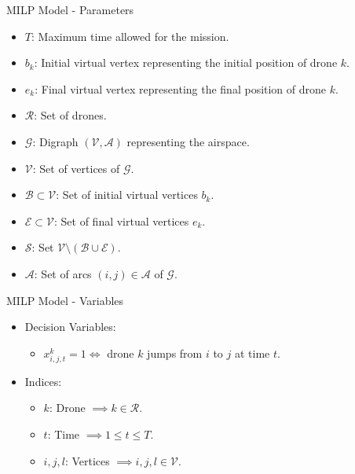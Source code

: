 \begin{frame}{MILP Model - Parameters}
    \begin{itemize}
        \item $T$: Maximum time allowed for the mission.
        \item $b_k$: Initial virtual vertex representing the initial position of drone $k$.
        \item $e_k$: Final virtual vertex representing the final position of drone $k$.
        \item $\mathcal{R}$: Set of drones.
        \item $\mathcal{G}$: Digraph $(\mathcal{V}, \mathcal{A})$ representing the airspace.
        \item $\mathcal{V}$: Set of vertices of $\mathcal{G}$.
        \item $\mathcal{B} \subset \mathcal{V}$: Set of initial virtual vertices $b_k$.
        \item $\mathcal{E} \subset \mathcal{V}$: Set of final virtual vertices $e_k$.
        \item $\mathcal{S}$: Set $\mathcal{V} \setminus (\mathcal{B} \cup \mathcal{E})$.
        \item $\mathcal{A}$: Set of arcs $(i,j) \in \mathcal{A}$ of $\mathcal{G}$.
    \end{itemize}
\end{frame}

\begin{frame}{MILP Model - Variables}
    \begin{itemize}
        \item Decision Variables:
        \begin{itemize}
            \item $x_{i,j,t}^k = 1 \iff$ drone $k$ jumps from $i$ to $j$ at time $t$.
        \end{itemize}
        \item Indices:
        \begin{itemize}
            \item $k$: Drone $\implies k \in \mathcal{R}$.
            \item $t$: Time $\implies 1 \leq t \leq T$.
            \item $i, j, l$: Vertices $\implies i, j, l \in \mathcal{V}$.
        \end{itemize}
    \end{itemize}
\end{frame}


